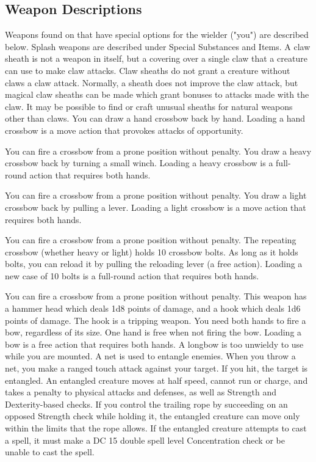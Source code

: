 \subsection{Weapon Descriptions}
Weapons found on  that have special options for the wielder ("you") are described below. Splash weapons are described under Special Substances and Items.
 A claw sheath is not a weapon in itself, but a covering over a single claw that a creature can use to make claw attacks. Claw sheaths do not grant a creature without claws a claw attack. Normally, a sheath does not improve the claw attack, but magical claw sheaths can be made which grant bonuses to attacks made with the claw. It may be possible to find or craft unusual sheaths for natural weapons other than claws.
 You can draw a hand crossbow back by hand. Loading a hand crossbow is a move action that provokes attacks of opportunity.
\par You can fire a crossbow from a prone position without penalty.
 You draw a heavy crossbow back by turning a small winch. Loading a heavy crossbow is a full-round action that requires both hands.
\par You can fire a crossbow from a prone position without penalty.
 You draw a light crossbow back by pulling a lever. Loading a light crossbow is a move action that requires both hands.
\par You can fire a crossbow from a prone position without penalty.
 The repeating crossbow (whether heavy or light) holds 10 crossbow bolts. As long as it holds bolts, you can reload it by pulling the reloading lever (a free action). Loading a new case of 10 bolts is a full-round action that requires both hands.
\par You can fire a crossbow from a prone position without penalty.
 This weapon has a hammer head which deals 1d8 points of damage, and a hook which deals 1d6 points of damage. The hook is a tripping weapon.
 You need both hands to fire a bow, regardless of its size. One hand is free when not firing the bow. Loading a bow is a free action that requires both hands. A longbow is too unwieldy to use while you are mounted.
 A net is used to entangle enemies. When you throw a net, you make a ranged touch attack against your target. If you hit, the target is entangled. An entangled creature moves at half speed, cannot run or charge, and takes a  penalty to physical attacks and defenses, as well as Strength and Dexterity-based checks. If you control the trailing rope by succeeding on an opposed Strength check while holding it, the entangled creature can move only within the limits that the rope allows. If the entangled creature attempts to cast a spell, it must make a DC 15 \add double spell level Concentration check or be unable to cast the spell.
